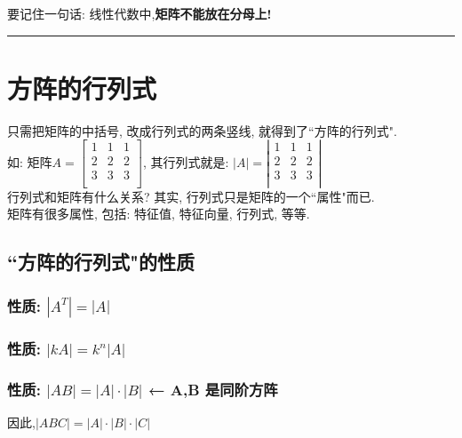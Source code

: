 \documentclass[UTF8]{ctexart}
\begin{document}
要记住一句话: 线性代数中,\textbf{矩阵不能放在分母上!} \\


\hrule



\section{方阵的行列式}

只需把矩阵的中括号, 改成行列式的两条竖线, 就得到了``方阵的行列式". \\
如: 矩阵$
A=\left[ \begin{matrix}
	1&		1&		1\\
	2&		2&		2\\
	3&		3&		3\\
\end{matrix} \right] 
$, 其行列式就是: 
$
|A|=\left| \begin{matrix}
	1&		1&		1\\
	2&		2&		2\\
	3&		3&		3\\
\end{matrix} \right|
$\\

行列式和矩阵有什么关系? 其实, 行列式只是矩阵的一个``属性"而已. \\
矩阵有很多属性, 包括: 特征值, 特征向量, 行列式, 等等. \\



\subsection{``方阵的行列式"的性质}

\subsubsection{性质: $|A^T|=|A|$}

\subsubsection{   性质: $|kA|=k^n|A|$}

\subsubsection{性质: $|AB|=|A| \cdot |B|$ ← A,B 是同阶方阵}

因此,$|ABC|=|A|\cdot |B|\cdot |C|$\\
\end{document}
